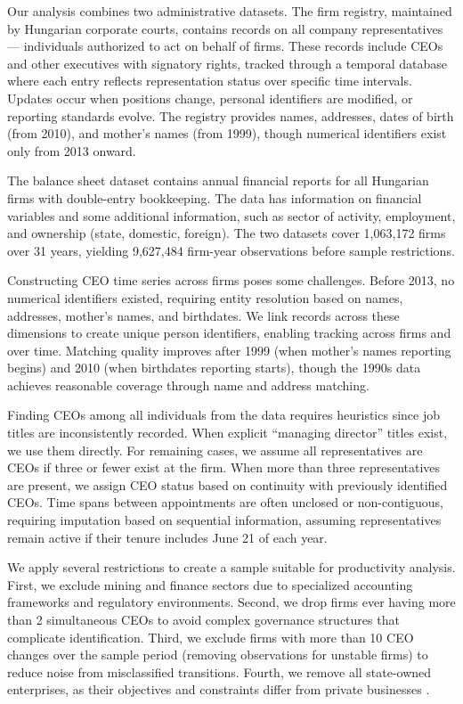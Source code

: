 \documentclass[11pt,a4paper]{article}
\begin{document}
Our analysis combines two administrative datasets. The firm registry, maintained by Hungarian corporate courts, contains records on all company representatives — individuals authorized to act on behalf of firms. These records include CEOs and other executives with signatory rights, tracked through a temporal database where each entry reflects representation status over specific time intervals. Updates occur when positions change, personal identifiers are modified, or reporting standards evolve. The registry provides names, addresses, dates of birth (from 2010), and mother's names (from 1999), though numerical identifiers exist only from 2013 onward.

The balance sheet dataset contains annual financial reports for all Hungarian firms with double-entry bookkeeping. The data has information on financial variables and some additional information, such as sector of activity, employment, and ownership (state, domestic, foreign). The two datasets cover 1,063,172 firms over 31 years, yielding 9,627,484 firm-year observations before sample restrictions.

Constructing CEO time series across firms poses some challenges. Before 2013, no numerical identifiers existed, requiring entity resolution based on names, addresses, mother's names, and birthdates. We link records across these dimensions to create unique person identifiers, enabling tracking across firms and over time. Matching quality improves after 1999 (when mother's names reporting begins) and 2010 (when birthdates reporting starts), though the 1990s data achieves reasonable coverage through name and address matching. 

Finding CEOs among all individuals from the data requires heuristics since job titles are inconsistently recorded. When explicit ``managing director'' titles exist, we use them directly. For remaining cases, we assume all representatives are CEOs if three or fewer exist at the firm. When more than three representatives are present, we assign CEO status based on continuity with previously identified CEOs. Time spans between appointments are often unclosed or non-contiguous, requiring imputation based on sequential information, assuming representatives remain active if their tenure includes June 21 of each year.

We apply several restrictions to create a sample suitable for productivity analysis. First, we exclude mining and finance sectors due to specialized accounting frameworks and regulatory environments. Second, we drop firms ever having more than 2 simultaneous CEOs to avoid complex governance structures that complicate identification. Third, we exclude firms with more than 10 CEO changes over the sample period (removing observations for unstable firms) to reduce noise from misclassified transitions. Fourth, we remove all state-owned enterprises, as their objectives and constraints differ from private businesses \citep{orban2019inception, shleifer1994politicians}.
\end{document}
